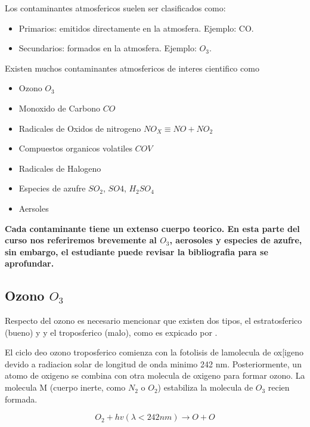 \documentclass[]{book}
\providecommand{\tightlist}{%
  \setlength{\itemsep}{0pt}\setlength{\parskip}{0pt}}
\begin{document}
Los contaminantes atmosfericos suelen ser clasificados como:

\begin{itemize}
\tightlist
\item
  Primarios: emitidos directamente en la atmosfera. Ejemplo: CO.
\item
  Secundarios: formados en la atmosfera. Ejemplo: \(O_3\).
\end{itemize}

Existen muchos contaminantes atmosfericos de interes cientifico como

\begin{itemize}
\tightlist
\item
  Ozono \(O_3\)
\item
  Monoxido de Carbono \(CO\)
\item
  Radicales de Oxidos de nitrogeno \(NO_X \equiv NO + NO_2\)
\item
  Compuestos organicos volatiles \(COV\)
\item
  Radicales de Halogeno
\item
  Especies de azufre \(SO_2\), \(SO4\), \(H_2SO_4\)
\item
  Aersoles
\end{itemize}

\textbf{Cada contaminante tiene un extenso cuerpo teorico. En esta parte del curso nos referiremos brevemente al \(O_3\), aerosoles y especies de azufre, sin embargo, el estudiante puede revisar la bibliografia para se aprofundar.}

\hypertarget{ozono-o_3}{%
\subsection{\texorpdfstring{Ozono \(O_3\)}{Ozono O\_3}}\label{ozono-o_3}}

Respecto del ozono es necesario mencionar que existen dos tipos, el estratosferico (bueno) y y el troposferico (malo),
como es expicado por \citet{brasseur2017modeling}.

El ciclo deo ozono troposferico comienza con la fotolisis de lamolecula de ox{[}igeno devido a radiacion solar de longitud de onda minimo 242 nm. Posteriormente, un atomo de oxigeno se combina con otra molecula de oxigeno para formar ozono. La molecula M (cuerpo inerte, como \(N_2\) o \(O_2\)) estabiliza la molecula de \(O_3\) recien formada.

\begin{equation}
O_2 + hv(\lambda < 242 nm)  \rightarrow O + O 
\label{eq:1}
\end{equation}
\end{document}
